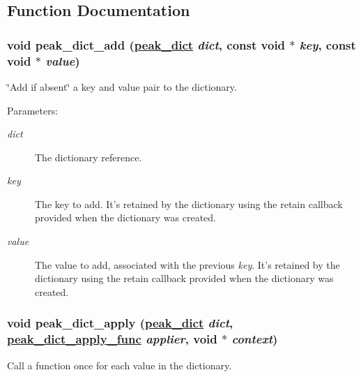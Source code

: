 \subsection{Function Documentation}
\hypertarget{group__dict_ga27}{
\subsubsection[peak\_\-dict\_\-add]{\setlength{\rightskip}{0pt plus 5cm}void peak\_\-dict\_\-add (\hyperlink{group__dict_ga0}{peak\_\-dict} {\em dict}, const void $\ast$ {\em key}, const void $\ast$ {\em value})}}
\label{group__dict_ga27}


\char`\"{}Add if absent\char`\"{} a key and value pair to the dictionary. 

\begin{Desc}
\item[Parameters:]
\begin{description}
\item[{\em dict}]The dictionary reference. \item[{\em key}]The key to add. It's retained by the dictionary using the retain callback provided when the dictionary was created. \item[{\em value}]The value to add, associated with the previous {\em key\/}. It's retained by the dictionary using the retain callback provided when the dictionary was created. \end{description}
\end{Desc}
\hypertarget{group__dict_ga26}{
\subsubsection[peak\_\-dict\_\-apply]{\setlength{\rightskip}{0pt plus 5cm}void peak\_\-dict\_\-apply (\hyperlink{group__dict_ga0}{peak\_\-dict} {\em dict}, \hyperlink{group__dict_ga21}{peak\_\-dict\_\-apply\_\-func} {\em applier}, void $\ast$ {\em context})}}
\label{group__dict_ga26}


Call a function once for each value in the dictionary. 

